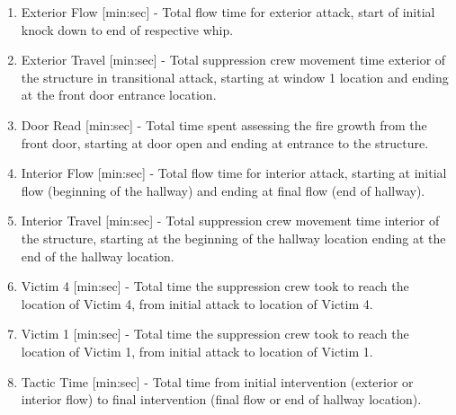 \documentclass[12pt,oneside]{book}
\begin{document}
\begin{enumerate}{}
\item Exterior Flow [min:sec] - Total flow time for exterior attack, start of initial knock down to end of respective whip. 
\item Exterior Travel [min:sec] - Total suppression crew movement time exterior of the structure in transitional attack, starting at window 1 location and ending at the front door entrance location. \\
\item Door Read [min:sec] - Total time spent assessing the fire growth from the front door, starting at door open and ending at entrance to the structure. \\
\item Interior Flow [min:sec] - Total flow time for interior attack, starting at initial flow (beginning of the hallway) and ending at final flow (end of hallway). \\
\item Interior Travel [min:sec] - Total suppression crew movement time interior of the structure, starting at the beginning of the hallway location ending at the end of the hallway location. \\
\item Victim 4 [min:sec] - Total time the suppression crew took to reach the location of Victim 4, from initial attack to location of Victim 4. \\
\item Victim 1 [min:sec] - Total time the suppression crew took to reach the location of Victim 1, from initial attack to location of Victim 1. \\
\item Tactic Time [min:sec] - Total time from initial intervention (exterior or interior flow) to final intervention (final flow or end of hallway location). \\
\end{enumerate}


\end{document}
